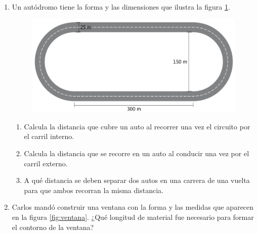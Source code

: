 \documentclass[11pt]{book}
\begin{document}
\begin{enumerate}
  \item Un autódromo tiene la forma y las dimensiones que ilustra la figura \ref{fig:autodromo}.
        \begin{figure}[H]
          \centering
          \includegraphics[width=.8\linewidth]{autodromo.png}
          \label{fig:autodromo}
        \end{figure}
        \begin{enumerate}
          \item Calcula la distancia que cubre un auto al recorrer una vez el circuito por el carril interno.\\
          \item Calcula la distancia que se recorre en un auto al conducir una vez por el carril externo.\\
          \item A qué distancia se deben separar dos autos en una carrera de una vuelta para que ambos recorran la misma distancia.
        \end{enumerate}
  \item Carlos mandó construir una ventana con la forma y las medidas que aparecen en
        la figura \ref{fig:ventana}. ¿Qué longitud de material fue necesario para formar el contorno de la ventana?


\end{enumerate}
\end{document}
